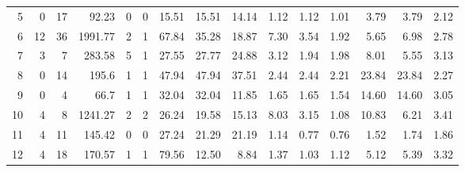 \begin{table}[!h]
\begin{threeparttable}
\begin{tabular}{rrrrrrrrrrrrrrr}
5     & 0                                                  & 17    & 92.23   & 0                                 & 0                                 & 15.51                     & 15.51                    & 14.14                    & 1.12     & 1.12     & 1.01     & 3.79     & 3.79     & 2.12   \\
6     & 12                                                 & 36    & 1991.77 & 2                                 & 1                                 & 67.84                     & 35.28                    & 18.87                    & 7.30     & 3.54     & 1.92     & 5.65     & 6.98     & 2.78   \\
7     & 3                                                  & 7     & 283.58  & 5                                 & 1                                 & 27.55                     & 27.77                    & 24.88                    & 3.12     & 1.94     & 1.98     & 8.01     & 5.55     & 3.13   \\
8     & 0                                                  & 14    & 195.6   & 1                                 & 1                                 & 47.94                     & 47.94                    & 37.51                    & 2.44     & 2.44     & 2.21     & 23.84    & 23.84    & 2.27   \\
9     & 0                                                  & 4     & 66.7    & 1                                 & 1                                 & 32.04                     & 32.04                    & 11.85                    & 1.65     & 1.65     & 1.54     & 14.60    & 14.60    & 3.05   \\
10    & 4                                                  & 8     & 1241.27 & 2                                 & 2                                 & 26.24                     & 19.58                    & 15.13                    & 8.03     & 3.15     & 1.08     & 10.83    & 6.21     & 3.41   \\
11    & 4                                                  & 11    & 145.42  & 0                                 & 0                                 & 27.24                     & 21.29                    & 21.19                    & 1.14     & 0.77     & 0.76     & 1.52     & 1.74     & 1.86   \\
12    & 4                                                  & 18    & 170.57  & 1                                 & 1                                 & 79.56                     & 12.50                    & 8.84                     & 1.37     & 1.03     & 1.12     & 5.12     & 5.39     & 3.32   \\

\end{tabular}
\end{threeparttable}
\end{table}
